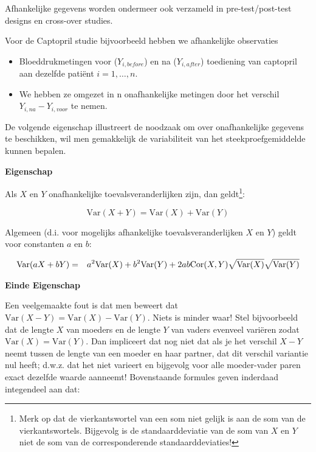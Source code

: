 \documentclass[
  12pt,dutch,coursenotes]{book}
\providecommand{\tightlist}{%
  \setlength{\itemsep}{0pt}\setlength{\parskip}{0pt}}
\theoremstyle{definition}
\theoremstyle{definition}
\theoremstyle{definition}
\theoremstyle{remark}
\begin{document}
Afhankelijke gegevens worden ondermeer ook verzameld in
pre-test/post-test designs en cross-over studies.

Voor de Captopril studie bijvoorbeeld hebben we afhankelijke observaties

\begin{itemize}
\tightlist
\item
  Bloeddrukmetingen voor (\(Y_{i,before}\)) en na (\(Y_{i,after}\)) toediening van captopril aan dezelfde patiënt \(i=1,\ldots,n\).
\item
  We hebben ze omgezet in n onafhankelijke metingen door het verschil \(Y_{i,na}-Y_{i,voor}\) te nemen.
\end{itemize}

De volgende eigenschap illustreert de noodzaak om over onafhankelijke gegevens te beschikken,
wil men gemakkelijk de variabiliteit van het steekproefgemiddelde kunnen bepalen.

\textbf{Eigenschap}

Als \(X\) en \(Y\) onafhankelijke toevalsveranderlijken zijn,
dan geldt\footnote{Merk op dat de vierkantswortel van een som niet gelijk is aan de som van de
  vierkantswortels. Bijgevolg is de standaarddeviatie van de som van \(X\) en \(Y\)
  niet de som van de corresponderende standaarddeviaties!}:

\begin{equation*}
\text{Var}(X+Y) = \text{Var}(X) + \text{Var}(Y)
\end{equation*}

Algemeen (d.i. voor mogelijks afhankelijke toevalsveranderlijken \(X\) en \(Y\)) geldt voor constanten \(a\) en \(b\):

\begin{eqnarray*}
\text{Var}(aX+bY) &=& a^2 \text{Var}(X) + b^2 \text{Var}(Y) + 2 ab {%
\text{Cor}}(X,Y)\sqrt{\text{Var}(X)}\sqrt{\text{Var}(Y)}
\end{eqnarray*}

\textbf{Einde Eigenschap}

Een veelgemaakte fout is dat men beweert dat \(\text{Var}(X-Y)=\text{Var}(X)-\text{Var}(Y)\). Niets is minder waar! Stel bijvoorbeeld dat de lengte \(X\) van moeders en de lengte \(Y\) van vaders evenveel variëren zodat \(\text{Var}(X)=\text{Var}(Y)\). Dan impliceert dat nog niet dat als je het verschil \(X-Y\) neemt tussen de lengte van een moeder en haar partner, dat dit verschil variantie nul heeft; d.w.z. dat het niet varieert en bijgevolg voor alle
moeder-vader paren exact dezelfde waarde aanneemt! Bovenstaande formules
geven inderdaad integendeel aan dat:
\end{document}
